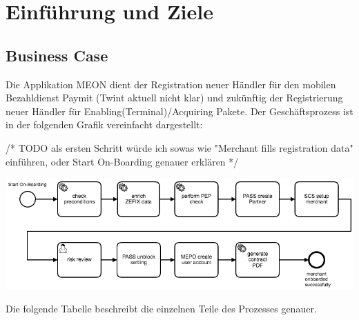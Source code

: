 \graphicspath{{./images/}}


\chapter{Einführung und Ziele}

\section{Business Case}
\label{businesscase}

Die Applikation MEON dient der Registration neuer Händler für den mobilen Bezahldienst Paymit (Twint aktuell nicht klar) und zukünftig der Registrierung neuer Händler für Enabling(Terminal)/Acquiring Pakete.  Der Geschäftsprozess ist in der folgenden Grafik vereinfacht dargestellt:

/* TODO als ersten Schritt würde ich sowas wie "Merchant fills registration data" einführen, oder Start On-Boarding genauer erklären */
\begin{center}
	\includegraphics[scale=0.4]{meon-workflow.png}
\end{center}

Die folgende Tabelle beschreibt die einzelnen Teile des Prozesses genauer.

